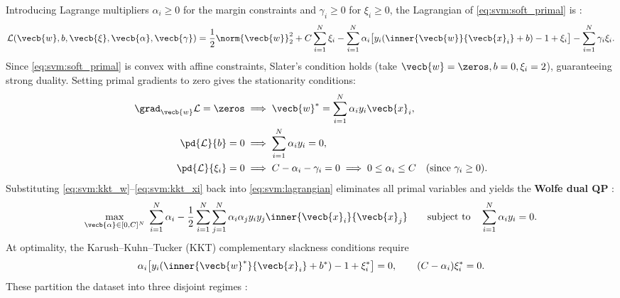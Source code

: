 \documentclass[../../../../master.tex]{subfiles}
\begin{document}
\begin{coremath}
Introducing Lagrange multipliers $\alpha_i \ge 0$ for the margin constraints and $\gamma_i \ge 0$ for $\xi_i \ge 0$, the Lagrangian of \eqref{eq:svm:soft_primal} is :
\begin{equation}
  \mathcal{L}(\vecb{w}, b, \vecb{\xi}, \vecb{\alpha}, \vecb{\gamma}) = \frac{1}{2}\norm{\vecb{w}}_2^2 + C\sum_{i=1}^N \xi_i - \sum_{i=1}^N \alpha_i \big[y_i(\inner{\vecb{w}}{\vecb{x}_i} + b) - 1 + \xi_i\big] - \sum_{i=1}^N \gamma_i \xi_i.
  \label{eq:svm:lagrangian}
\end{equation}
Since \eqref{eq:svm:soft_primal} is convex with affine constraints, Slater's condition holds (take $\vecb{w} = \zeros, b = 0, \xi_i = 2$), guaranteeing strong duality. Setting primal gradients to zero gives the stationarity conditions:
\begin{align}
  \grad_{\vecb{w}} \mathcal{L} = \zeros &\implies \vecb{w}^* = \sum_{i=1}^N \alpha_i y_i \vecb{x}_i, \label{eq:svm:kkt_w} \\
  \pd{\mathcal{L}}{b} = 0 &\implies \sum_{i=1}^N \alpha_i y_i = 0, \label{eq:svm:kkt_b} \\
  \pd{\mathcal{L}}{\xi_i} = 0 &\implies C - \alpha_i - \gamma_i = 0 \implies 0 \le \alpha_i \le C \quad (\text{since } \gamma_i \ge 0). \label{eq:svm:kkt_xi}
\end{align}
Substituting \eqref{eq:svm:kkt_w}--\eqref{eq:svm:kkt_xi} back into \eqref{eq:svm:lagrangian} eliminates all primal variables and yields the \textbf{Wolfe dual QP}  :
\begin{equation}
  \max_{\vecb{\alpha} \in [0, C]^N} \; \sum_{i=1}^N \alpha_i - \frac{1}{2} \sum_{i=1}^N \sum_{j=1}^N \alpha_i \alpha_j y_i y_j \inner{\vecb{x}_i}{\vecb{x}_j}
  \qquad \text{subject to} \quad \sum_{i=1}^N \alpha_i y_i = 0.
  \label{eq:svm:dual_qp}
\end{equation}
At optimality, the Karush--Kuhn--Tucker (KKT) complementary slackness conditions require
\begin{equation}
  \alpha_i \big[y_i(\inner{\vecb{w}^*}{\vecb{x}_i} + b^*) - 1 + \xi_i^*\big] = 0, \qquad (C - \alpha_i)\xi_i^* = 0.
  \label{eq:svm:kkt_cs}
\end{equation}
These partition the dataset into three disjoint regimes  :

\end{coremath}
\end{document}
